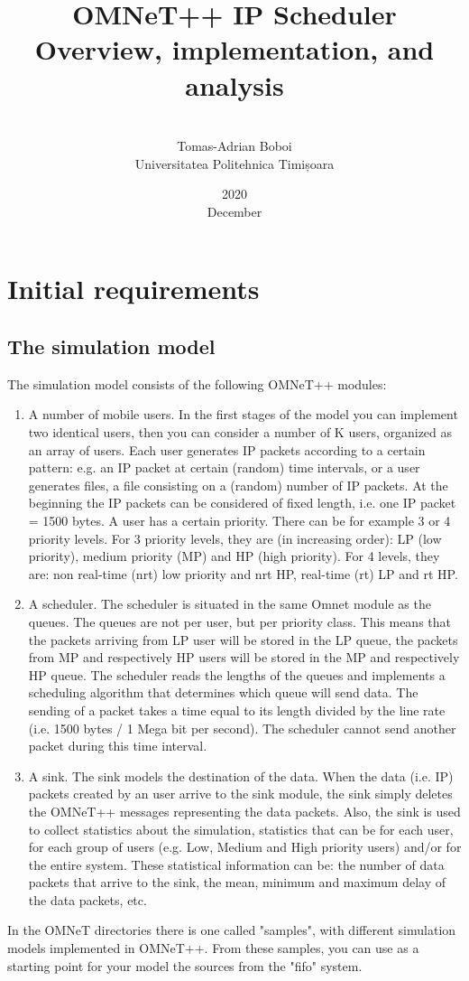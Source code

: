 \documentclass[12pt]{article}
\title{OMNeT++ IP Scheduler\\\large{Overview, implementation, and analysis}}
\date{2020\\December}
\author{\\Tomas-Adrian Boboi\\Universitatea Politehnica Timișoara}
\begin{document}
    \maketitle
    \pagebreak
    
    \tableofcontents
    \pagebreak
    
    \section{Initial requirements}
        \subsection*{The simulation model}
        The simulation model consists of the following OMNeT++ modules:
        \begin{enumerate}
            \item{A number of mobile users. In the first stages of the model you can implement two identical users, then you can consider a number of K users, organized as an array of users. Each user generates IP packets according to a certain pattern: e.g. an IP packet at certain (random) time intervals, or a user generates files, a file consisting on a (random) number of IP packets. At the beginning the IP packets can be considered of fixed length, i.e. one IP packet = 1500 bytes. A user has a certain priority. There can be for example 3 or 4 priority levels. For 3 priority levels, they are (in increasing order): LP (low priority), medium priority (MP) and HP (high priority). For 4 levels, they are: non real-time (nrt) low priority and nrt HP, real-time (rt) LP and rt HP.}
            \item{A scheduler. The scheduler is situated in the same Omnet module as the queues. The queues are not per user, but per priority class. This means that the packets arriving from LP user will be stored in the LP queue, the packets from MP and respectively HP users will be stored in the MP and respectively HP queue. The scheduler reads the lengths of the queues and implements a scheduling algorithm that determines which queue will send data. The sending of a packet takes a time equal to its length divided by the line rate (i.e. 1500 bytes / 1 Mega bit per second). The scheduler cannot send another packet during this time interval.}
            \item{A sink. The sink models the destination of the data. When the data (i.e. IP) packets created by an user arrive to the sink module, the sink simply deletes the OMNeT++ messages representing the data packets. Also, the sink is used to collect statistics about the simulation, statistics that can be for each user, for each group of users (e.g. Low, Medium and High priority users) and/or for the entire system. These statistical information can be: the number of data packets that arrive to the sink, the mean, minimum and maximum delay of the data packets, etc.}
        \end{enumerate}
        In the OMNeT directories there is one called "samples", with different simulation models implemented in OMNeT++. From these samples, you can use as a starting point for your model the sources from the "fifo" system.
        
\end{document}
